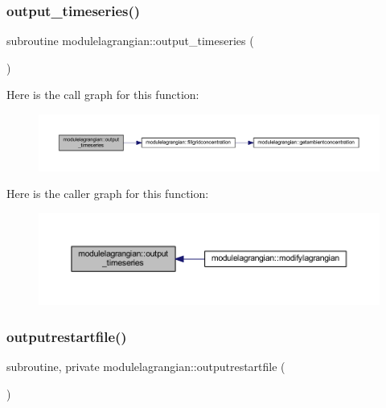 \subsubsection{\texorpdfstring{output\+\_\+timeseries()}{output\_timeseries()}}
{\footnotesize\ttfamily subroutine modulelagrangian\+::output\+\_\+timeseries (\begin{DoxyParamCaption}{ }\end{DoxyParamCaption})\hspace{0.3cm}{\ttfamily [private]}}

Here is the call graph for this function\+:\nopagebreak
\begin{figure}[H]
\begin{center}
\leavevmode
\includegraphics[width=350pt]{namespacemodulelagrangian_a0fa6098d248ced3df6bda0b337789166_cgraph}
\end{center}
\end{figure}
Here is the caller graph for this function\+:\nopagebreak
\begin{figure}[H]
\begin{center}
\leavevmode
\includegraphics[width=350pt]{namespacemodulelagrangian_a0fa6098d248ced3df6bda0b337789166_icgraph}
\end{center}
\end{figure}
\mbox{\label{namespacemodulelagrangian_aeabb1bf3ca49fb9ff017aaf38a5ad02b}} 
\subsubsection{\texorpdfstring{outputrestartfile()}{outputrestartfile()}}
{\footnotesize\ttfamily subroutine, private modulelagrangian\+::outputrestartfile (\begin{DoxyParamCaption}{ }\end{DoxyParamCaption})\hspace{0.3cm}{\ttfamily [private]}}

